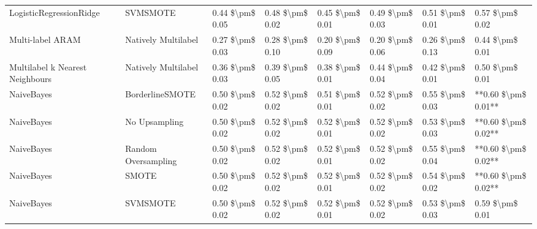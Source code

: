 \begin{tabular}{llllllll}
        LogisticRegressionRidge &                      SVMSMOTE & 0.44 \$\textbackslash pm\$ 0.05 &           0.48 \$\textbackslash pm\$ 0.02 &       0.45 \$\textbackslash pm\$ 0.01 &        0.49 \$\textbackslash pm\$ 0.03 &                         0.51 \$\textbackslash pm\$ 0.01 &     0.57 \$\textbackslash pm\$ 0.02 \\
               Multi-label ARAM &           Natively Multilabel & 0.27 \$\textbackslash pm\$ 0.03 &           0.28 \$\textbackslash pm\$ 0.10 &       0.20 \$\textbackslash pm\$ 0.09 &        0.20 \$\textbackslash pm\$ 0.06 &                         0.26 \$\textbackslash pm\$ 0.13 &     0.44 \$\textbackslash pm\$ 0.01 \\
Multilabel k Nearest Neighbours &           Natively Multilabel & 0.36 \$\textbackslash pm\$ 0.03 &           0.39 \$\textbackslash pm\$ 0.05 &       0.38 \$\textbackslash pm\$ 0.01 &        0.44 \$\textbackslash pm\$ 0.04 &                         0.42 \$\textbackslash pm\$ 0.01 &     0.50 \$\textbackslash pm\$ 0.01 \\
                     NaiveBayes &               BorderlineSMOTE & 0.50 \$\textbackslash pm\$ 0.02 &           0.52 \$\textbackslash pm\$ 0.02 &       0.51 \$\textbackslash pm\$ 0.01 &        0.52 \$\textbackslash pm\$ 0.02 &                         0.55 \$\textbackslash pm\$ 0.03 & **0.60 \$\textbackslash pm\$ 0.01** \\
                     NaiveBayes &                 No Upsampling & 0.50 \$\textbackslash pm\$ 0.02 &           0.52 \$\textbackslash pm\$ 0.02 &       0.52 \$\textbackslash pm\$ 0.01 &        0.52 \$\textbackslash pm\$ 0.02 &                         0.53 \$\textbackslash pm\$ 0.03 & **0.60 \$\textbackslash pm\$ 0.02** \\
                     NaiveBayes &           Random Oversampling & 0.50 \$\textbackslash pm\$ 0.02 &           0.52 \$\textbackslash pm\$ 0.02 &       0.52 \$\textbackslash pm\$ 0.01 &        0.52 \$\textbackslash pm\$ 0.02 &                         0.55 \$\textbackslash pm\$ 0.04 & **0.60 \$\textbackslash pm\$ 0.02** \\
                     NaiveBayes &                         SMOTE & 0.50 \$\textbackslash pm\$ 0.02 &           0.52 \$\textbackslash pm\$ 0.02 &       0.52 \$\textbackslash pm\$ 0.01 &        0.52 \$\textbackslash pm\$ 0.02 &                         0.54 \$\textbackslash pm\$ 0.02 & **0.60 \$\textbackslash pm\$ 0.02** \\
                     NaiveBayes &                      SVMSMOTE & 0.50 \$\textbackslash pm\$ 0.02 &           0.52 \$\textbackslash pm\$ 0.02 &       0.52 \$\textbackslash pm\$ 0.01 &        0.52 \$\textbackslash pm\$ 0.02 &                         0.53 \$\textbackslash pm\$ 0.03 &     0.59 \$\textbackslash pm\$ 0.01 \\

\end{tabular}
